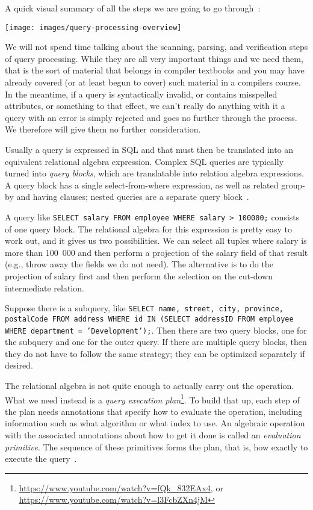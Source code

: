 \documentclass[a4paper]{report}
\begin{document}
A quick visual summary of all the steps we are going to go through~\cite{dsc}:
\begin{center}
	\texttt{[image: images/query-processing-overview]}
\end{center}

We will not spend time talking about the scanning, parsing, and verification steps of query processing. While they are all very important things and we need them, that is the sort of material that belongs in compiler textbooks and you may have already covered (or at least begun to cover) such material in a compilers course. In the meantime, if a query is syntactically invalid, or contains misspelled attributes, or something to that effect, we can't really do anything with it a query with an error is simply rejected and  goes no further through the process. We therefore will give them no further consideration.

Usually a query is expressed in SQL and that must then be translated into an equivalent relational algebra expression. Complex SQL queries are typically turned into \textit{query blocks}, which are translatable into relation algebra expressions. A query block has a single select-from-where expression, as well as related group-by and having clauses; nested queries are a separate query block~\cite{fds}.

A query like \texttt{SELECT salary FROM employee WHERE salary > 100000;} consists of one query block. The relational algebra for this expression is pretty easy to work out, and it gives us two possibilities. We can select all tuples where salary is more than 100~000 and then perform a projection of the salary field of that result (e.g., throw away the fields we do not need). The alternative is to do the projection of salary first and then perform the selection on the cut-down intermediate relation.

Suppose there is a subquery, like \texttt{SELECT name, street, city, province, postalCode FROM address WHERE id IN (SELECT addressID FROM employee WHERE department = 'Development');}. Then there are two query blocks, one for the subquery and one for the outer query. If there are multiple query blocks, then they do not have to follow the same strategy; they can be optimized separately if desired. 

The relational algebra is not quite enough to actually carry out the operation. What we need instead is a \textit{query execution plan}\footnote{\url{https://www.youtube.com/watch?v=fQk_832EAx4}, or \url{https://www.youtube.com/watch?v=l3FcbZXn4jM}}. To build that up, each step of the plan needs annotations that specify how to evaluate the operation, including information such as what algorithm or what index to use. An algebraic operation with the associated annotations about how to get it done is called an \textit{evaluation primitive}. The sequence of these primitives forms the plan, that is, how exactly to execute the query~\cite{dsc}. 
\end{document}
